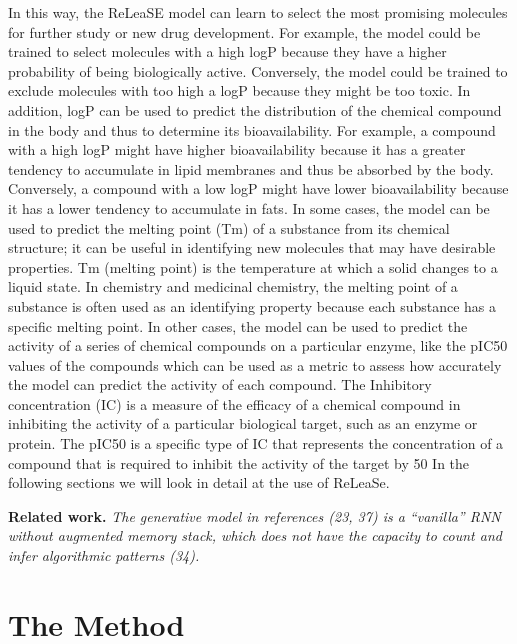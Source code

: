 \documentclass[a4paper]{article}
\newcommand{\mypar}[1]{{\bf #1.}}
\begin{document}
In this way, the ReLeaSE model can learn to select the most promising molecules for further study or new drug development. 
For example, the model could be trained to select molecules with a high logP because they have a higher probability of being biologically active. Conversely, the model could be trained to exclude molecules with too high a logP because they might be too toxic. In addition, logP can be used to predict the distribution of the chemical compound in the body and thus to determine its bioavailability. For example, a compound with a high logP might have higher bioavailability because it has a greater tendency to accumulate in lipid membranes and thus be absorbed by the body. Conversely, a compound with a low logP might have lower bioavailability because it has a lower tendency to accumulate in fats.
In some cases, the model can be used to predict the melting point (Tm) of a substance from its chemical structure; it can be useful in identifying new molecules that may have desirable properties. Tm (melting point) is the temperature at which a solid changes to a liquid state. In chemistry and medicinal chemistry, the melting point of a substance is often used as an identifying property because each substance has a specific melting point. 
In other cases, the model can be used to predict the activity of a series of chemical compounds on a particular enzyme, like the pIC50 values of the compounds which can be used as a metric to assess how accurately the model can predict the activity of each compound. The Inhibitory concentration (IC) is a measure of the efficacy of a chemical compound in inhibiting the activity of a particular biological target, such as an enzyme or protein. The pIC50 is a specific type of IC that represents the concentration of a compound that is required to inhibit the activity of the target by 50%
In the following sections we will look in detail at the use of ReLeaSe.

\mypar{Related work} 
\textit{The generative
model in references (23, 37) is a “vanilla” RNN without augmented
memory stack, which does not have the capacity to count and infer
algorithmic patterns (34).
}

\section{The Method}\label{sec:The Method}
\end{document}
